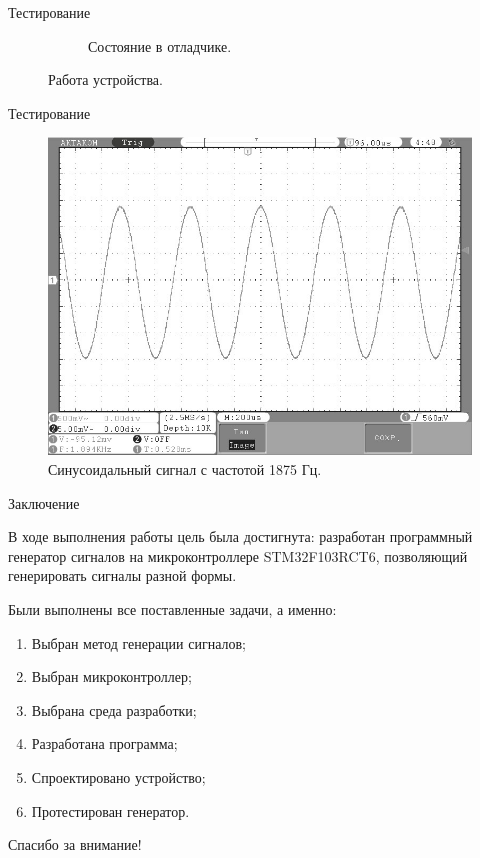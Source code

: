 \documentclass[10pt]{beamer}
\begin{document}
\begin{frame}{Тестирование}
\begin{figure}
\begin{subfigure}[H]{0.45\textwidth}
         \caption{Состояние в отладчике.}
     \end{subfigure}
        \caption{Работа устройства.}
\end{figure}
\end{frame}

\begin{frame}{Тестирование}
  \begin{figure}
  \includegraphics[width=1\textwidth]{1875}
  \caption{Синусоидальный сигнал с частотой 1875 Гц.}
  \end{figure}
\end{frame}

\begin{frame}{Заключение}

	В ходе выполнения работы цель была достигнута: разработан программный генератор сигналов на микроконтроллере STM32F103RCT6, позволяющий генерировать сигналы разной формы.
	
	Были выполнены все поставленные задачи, а именно:
	\begin{enumerate}
		\item Выбран метод генерации сигналов;
		\item Выбран микроконтроллер;
		\item Выбрана среда разработки;
		\item Разработана программа;
		\item Спроектировано устройство;
		\item Протестирован генератор.
	\end{enumerate}
	
	
	

\end{frame}

\begin{frame}
\begin{center}
{\Huge Спасибо за внимание! }
\end{center}
\end{frame}
\end{document}
